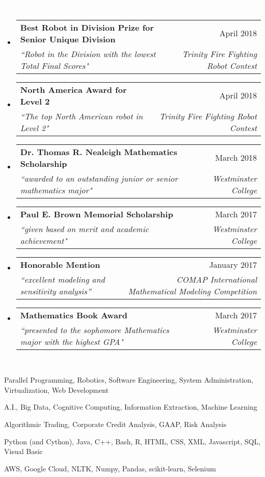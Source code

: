 \documentclass[letterpaper,11pt]{article}
\makeatletter
\newcommand{\resheading}[1]{{\large \colorbox{electricpurple}{\begin{minipage}{\textwidth}{\textbf{#1 \vphantom{p\^{E}}}}\end{minipage}}}}
\newcommand{\ressubheading}[4]{
	\begin{tabular*}{7.0in}{l@{\extracolsep{\fill}}r}
		\textbf{#1} & #2 \\
		\textit{#3} & \textit{#4} \\
	\end{tabular*}\vspace{-6pt}}
\makeatother
\begin{document}
		\resheading{\textcolor{white}{Awards}}

		\begin{itemize}[topsep=3pt, itemsep=1pt]
			\item
			\ressubheading{Best Robot in Division Prize for Senior Unique Division}{April 2018}{``Robot in the Division with the lowest Total Final Scores"}{Trinity Fire Fighting Robot Contest}
			\item
			\ressubheading{North America Award for Level 2}{April 2018}{``The top North American robot in Level 2"}{Trinity Fire Fighting Robot Contest}
			\item
			\ressubheading{Dr. Thomas R. Nealeigh Mathematics Scholarship}{March 2018}{``awarded to an outstanding junior or senior mathematics major"}{Westminster College}
			\item
			\ressubheading{Paul E. Brown Memorial Scholarship}{March 2017}{``given based on merit and academic achievement"}{Westminster College}
			\item
			\ressubheading{Honorable Mention}{January 2017}{``excellent modeling and sensitivity analysis''}{COMAP International Mathematical Modeling Competition}
			\item
			\ressubheading{Mathematics Book Award}{March 2017}{``presented to the sophomore Mathematics major with the highest GPA"}{Westminster College}
		\end{itemize}
	
	\resheading{\textcolor{white}{Skills}}
	
	\begin{description}[itemsep=1pt]
		\item[Computer Science:]  Parallel Programming, Robotics, Software Engineering, System Administration, Virtualization, Web Development
		\item[Data Science:] A.I., Big Data, Cognitive Computing, Information Extraction, Machine Learning
		\item[Finance and Economics:] Algorithmic Trading, Corporate Credit Analysis, GAAP, Risk Analysis
		\item[Languages:] Python (and Cython), Java, C++, Bash, R, HTML, CSS, XML, Javascript, SQL, Visual Basic
		\item[Software \& Tools:] AWS, Google Cloud, NLTK, Numpy, Pandas, scikit-learn, Selenium
	\end{description}
	
\end{document}
